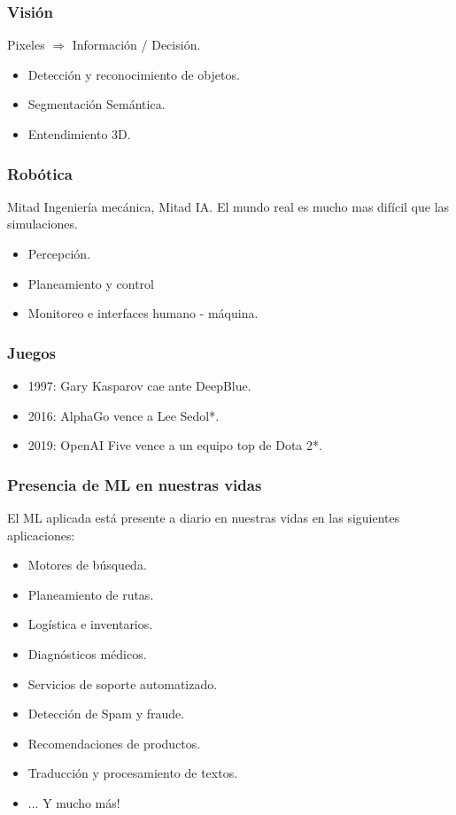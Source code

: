 \documentclass[10pt]{beamer}
\begin{document}
\begin{frame}
    \frametitle{Visión}
    Pixeles $\Rightarrow$ Información / Decisión.

    \begin{itemize}
        \item Detección y reconocimiento de objetos.
        \item Segmentación Semántica.
        \item Entendimiento 3D.
    \end{itemize}
\end{frame}

\begin{frame}
    \frametitle{Robótica}
    Mitad Ingeniería mecánica, Mitad IA. El mundo real es mucho mas difícil que las simulaciones.

    \begin{itemize}
        \item Percepción.
        \item Planeamiento y control
        \item Monitoreo e interfaces humano - máquina.
    \end{itemize}
\end{frame}

\begin{frame}
    \frametitle{Juegos}
    \begin{itemize}
        \item 1997: Gary Kasparov cae ante DeepBlue.
        \item 2016: AlphaGo vence a Lee Sedol*.
        \item 2019: OpenAI Five vence a un equipo top de Dota 2*.
    \end{itemize}
\end{frame}


\begin{frame}
    \frametitle{Presencia de ML en nuestras vidas}
    El ML aplicada está presente a diario en nuestras vidas en las siguientes aplicaciones:

    \begin{itemize}
        \item Motores de búsqueda.
        \item Planeamiento de rutas.
        \item Logística e inventarios.
        \item Diagnósticos médicos.
        \item Servicios de soporte automatizado.
        \item Detección de Spam y fraude.
        \item Recomendaciones de productos.
        \item Traducción y procesamiento de textos.
        \pause
        \item ... Y mucho más!
    \end{itemize}
\end{frame}
\end{document}
